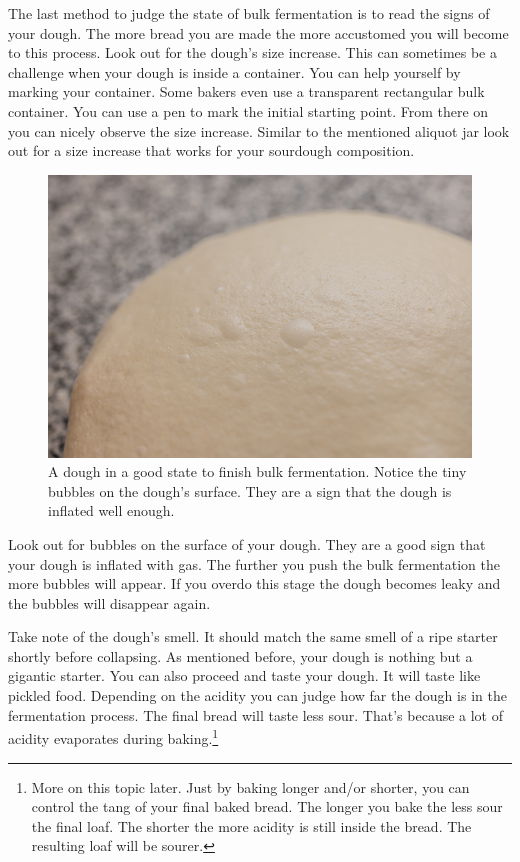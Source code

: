 The last method to judge the state of bulk fermentation
is to read the signs of your dough. The more bread you are
made the more accustomed you will become to this process.
Look out for the dough's size increase. This can sometimes
be a challenge when your dough is inside a container.
You can help yourself by marking your container. Some bakers
even use a transparent rectangular bulk container. You
can use a pen to mark the initial starting point. From there
on you can nicely observe the size increase. Similar to the
mentioned aliquot jar look out for a size increase that works
for your sourdough composition.

\begin{figure}[!htb]
  \includegraphics[width=\textwidth]{bulk-finished-dough}
  \caption{A dough in a good state to finish bulk fermentation. Notice
  the tiny bubbles on the dough's surface. They are a sign that the dough
  is inflated well enough.}
\end{figure}

Look out for bubbles on the surface of your dough. They
are a good sign that your dough is inflated with gas. The
further you push the bulk fermentation the more bubbles
will appear. If you overdo this stage the dough becomes leaky and
the bubbles will disappear again.

Take note of the dough's smell. It should match the same
smell of a ripe starter shortly before collapsing. As mentioned
before, your dough is nothing but a gigantic starter. You
can also proceed and taste your dough. It will taste like
pickled food. Depending on the acidity you can judge how
far the dough is in the fermentation process. The final bread
will taste less sour. That's because a lot of acidity evaporates
during baking.\footnote{More on this topic later.
Just by baking longer and/or shorter, you can control
the tang of your final baked bread. The longer
you bake the less sour the final loaf. The shorter
the more acidity is still inside the bread. The resulting
loaf will be sourer.}

